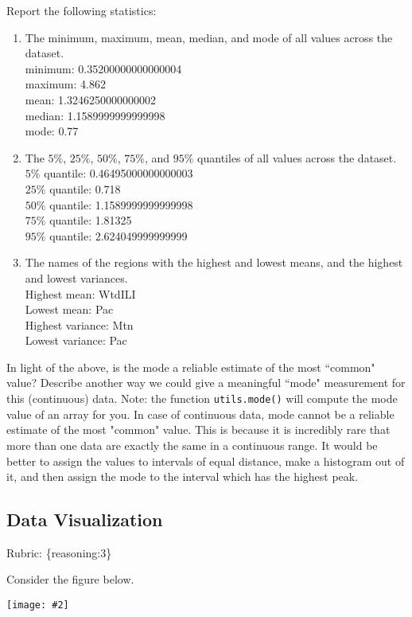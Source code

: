 \documentclass{article}
\def\rubric#1{\gre{Rubric: \{#1\}}}{}
\def\blu#1{{\color{blu}#1}}
\def\gre#1{{\color{gre}#1}}
\def\red#1{{\color{red}#1}}
\newcommand{\fig}[2]{\texttt{[image: \#2]}}
\def\enum#1{\begin{enumerate}#1\end{enumerate}}
\begin{document}
\blu{Report the following statistics}:
\enum{
\item The minimum, maximum, mean, median, and mode of all values across the dataset.\\
\red{minimum: 0.35200000000000004} \\
\red{maximum: 4.862} \\
\red{mean: 1.3246250000000002} \\
\red{median: 1.1589999999999998} \\
\red{mode: 0.77}
\item The $5\%$, $25\%$, $50\%$, $75\%$, and $95\%$ quantiles of all values across the dataset. \\
\red{$5\%$ quantile: 0.46495000000000003} \\
\red{$25\%$ quantile: 0.718} \\
\red{$50\%$ quantile: 1.1589999999999998} \\
\red{$75\%$ quantile: 1.81325} \\
\red{$95\%$ quantile: 2.624049999999999}
\item The names of the regions with the highest and lowest means, and the highest and lowest variances. \\
\red{Highest mean: WtdILI} \\
\red{Lowest mean: Pac} \\
\red{Highest variance: Mtn} \\
\red{Lowest variance: Pac}
}
In light of the above, \blu{is the mode a reliable estimate of the most ``common" value? Describe another way we could give a meaningful ``mode" measurement for this (continuous) data.} Note: the function \texttt{utils.mode()} will compute the mode value of an array for you.
\red{In case of continuous data, mode cannot be a reliable estimate of the most "common" value. This is because it is incredibly rare that more than one data are exactly the same in a continuous range. It would be better to assign the values to intervals of equal distance, make a histogram out of it, and then assign the mode to the interval which has the highest peak.}

\subsection{Data Visualization}
\rubric{reasoning:3}

Consider the figure below.

\fig{1}{./figs/visualize-unlabeled}
\end{document}
